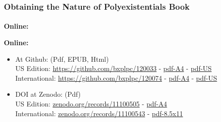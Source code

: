 \begin{whenOrg}
\begin{frame}[fragile,plain,label=obtainingPolyBook]
    \frametitle{Obtaining the Nature of Polyexistentials Book}
    \framesubtitle{}

\begin{htmlonly} %
    \begin{center}
          \textbf{Online:}
    \end{center}
\end{htmlonly}

\begin{latexonly}
    \begin{center}
          \colorbox{blue!30}{\color{black} \textbf{Online:}}
    \end{center}
\end{latexonly}

    \addtolength{\leftmargini}{\labelsep}

    \begin{itemize}
      \item At Github: (Pdf, EPUB, Html) \\
      US Edition:   \url{https://github.com/bxplpc/120033} - \href{https://github.com/bxplpc/120033/blob/main/pdf/c-120033-1_05-book-a4-col-emb-pub.pdf}{pdf-A4} -
      \href{https://github.com/bxplpc/120033/blob/main/pdf/c-120033-1_05-book-8.5x11-col-emb-pub.pdf}{pdf-US}\\
      International: \url{https://github.com/bxplpc/120074} - \href{https://github.com/bxplpc/120074/blob/main/pdf/c-120074-1_05-book-a4-col-emb-pub.pdf}{pdf-A4} -   \href{https://github.com/bxplpc/120074/blob/main/pdf/c-120074-1_05-book-8.5x11-col-emb-pub.pdf}{pdf-US}\\
      \item DOI at Zenodo: (Pdf)\\
      US Edition:   \href{https://zenodo.org/records/11100505}{zenodo.org/records/11100505}  -   \href{https://zenodo.org/records/11100527}{pdf-A4}\\
      International: \href{https://zenodo.org/records/11100543}{zenodo.org/records/11100543}  -   \href{https://zenodo.org/records/11100551}{pdf-8.5x11}\\
    \end{itemize}


\end{frame}
\end{whenOrg}
